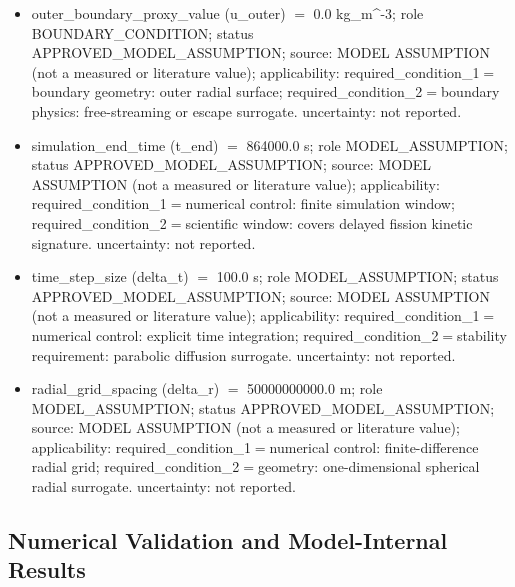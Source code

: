 \documentclass[11pt]{article}
\begin{document}
\begin{itemize}
\item outer\_\allowbreak{}boundary\_\allowbreak{}proxy\_\allowbreak{}value (u\_\allowbreak{}outer) \ensuremath{=} 0.0 kg\_\allowbreak{}m\textasciicircum{}-3; role BOUNDARY\_\allowbreak{}CONDITION; status APPROVED\_\allowbreak{}MODEL\_\allowbreak{}ASSUMPTION; source: MODEL ASSUMPTION (not a measured or literature value); applicability: required\_\allowbreak{}condition\_\allowbreak{}1\ensuremath{=}boundary geometry: outer radial surface; required\_\allowbreak{}condition\_\allowbreak{}2\ensuremath{=}boundary physics: free-streaming or escape surrogate. uncertainty: not reported.
\item simulation\_\allowbreak{}end\_\allowbreak{}time (t\_\allowbreak{}end) \ensuremath{=} 864000.0 s; role MODEL\_\allowbreak{}ASSUMPTION; status APPROVED\_\allowbreak{}MODEL\_\allowbreak{}ASSUMPTION; source: MODEL ASSUMPTION (not a measured or literature value); applicability: required\_\allowbreak{}condition\_\allowbreak{}1\ensuremath{=}numerical control: finite simulation window; required\_\allowbreak{}condition\_\allowbreak{}2\ensuremath{=}scientific window: covers delayed fission kinetic signature. uncertainty: not reported.
\item time\_\allowbreak{}step\_\allowbreak{}size (delta\_\allowbreak{}t) \ensuremath{=} 100.0 s; role MODEL\_\allowbreak{}ASSUMPTION; status APPROVED\_\allowbreak{}MODEL\_\allowbreak{}ASSUMPTION; source: MODEL ASSUMPTION (not a measured or literature value); applicability: required\_\allowbreak{}condition\_\allowbreak{}1\ensuremath{=}numerical control: explicit time integration; required\_\allowbreak{}condition\_\allowbreak{}2\ensuremath{=}stability requirement: parabolic diffusion surrogate. uncertainty: not reported.
\item radial\_\allowbreak{}grid\_\allowbreak{}spacing (delta\_\allowbreak{}r) \ensuremath{=} 50000000000.0 m; role MODEL\_\allowbreak{}ASSUMPTION; status APPROVED\_\allowbreak{}MODEL\_\allowbreak{}ASSUMPTION; source: MODEL ASSUMPTION (not a measured or literature value); applicability: required\_\allowbreak{}condition\_\allowbreak{}1\ensuremath{=}numerical control: finite-difference radial grid; required\_\allowbreak{}condition\_\allowbreak{}2\ensuremath{=}geometry: one-dimensional spherical radial surrogate. uncertainty: not reported.
\end{itemize}

\subsection{Numerical Validation and Model-Internal Results}
\end{document}
